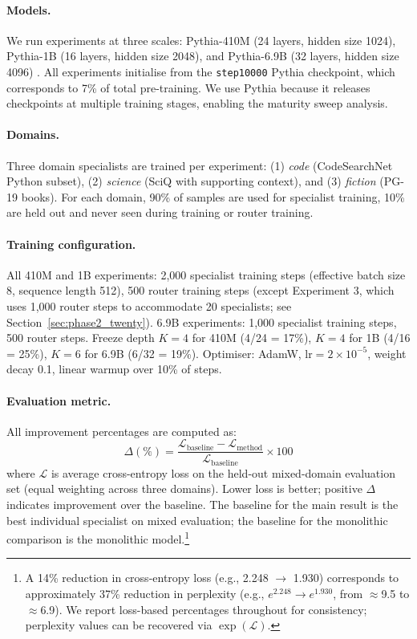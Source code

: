 \documentclass{article}
\begin{document}
\paragraph{Models.} We run experiments at three scales: Pythia-410M (24 layers, hidden size 1024), Pythia-1B (16 layers, hidden size 2048), and Pythia-6.9B (32 layers, hidden size 4096) \citep{biderman2023pythia}. All experiments initialise from the \texttt{step10000} Pythia checkpoint, which corresponds to 7\% of total pre-training. We use Pythia because it releases checkpoints at multiple training stages, enabling the maturity sweep analysis.

\paragraph{Domains.} Three domain specialists are trained per experiment: (1) \emph{code} (CodeSearchNet Python subset), (2) \emph{science} (SciQ with supporting context), and (3) \emph{fiction} (PG-19 books). For each domain, 90\% of samples are used for specialist training, 10\% are held out and never seen during training or router training.

\paragraph{Training configuration.} All 410M and 1B experiments: 2,000 specialist training steps (effective batch size 8, sequence length 512), 500 router training steps (except Experiment 3, which uses 1,000 router steps to accommodate 20 specialists; see Section~\ref{sec:phase2_twenty}). 6.9B experiments: 1,000 specialist training steps, 500 router steps. Freeze depth $K=4$ for 410M (4/24 = 17\%), $K=4$ for 1B (4/16 = 25\%), $K=6$ for 6.9B (6/32 = 19\%). Optimiser: AdamW, $\text{lr}=2\times10^{-5}$, weight decay 0.1, linear warmup over 10\% of steps.

\paragraph{Evaluation metric.} All improvement percentages are computed as:
\[
\Delta(\%) = \frac{\mathcal{L}_\text{baseline} - \mathcal{L}_\text{method}}{\mathcal{L}_\text{baseline}} \times 100
\]
where $\mathcal{L}$ is average cross-entropy loss on the held-out mixed-domain evaluation set (equal weighting across three domains). Lower loss is better; positive $\Delta$ indicates improvement over the baseline. The baseline for the main result is the best individual specialist on mixed evaluation; the baseline for the monolithic comparison is the monolithic model.\footnote{A 14\% reduction in cross-entropy loss (e.g., 2.248 $\to$ 1.930) corresponds to approximately 37\% reduction in perplexity (e.g., $e^{2.248} \to e^{1.930}$, from $\approx$9.5 to $\approx$6.9). We report loss-based percentages throughout for consistency; perplexity values can be recovered via $\exp(\mathcal{L})$.}
\end{document}
